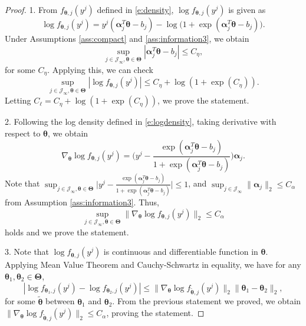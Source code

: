 \documentclass[10pt,a4paper]{amsart}
\newcommand{\bfTheta}{\boldsymbol{\Theta}}
\newcommand{\bfalpha}{\boldsymbol{\alpha}}
\newcommand{\bftheta}{\boldsymbol{\theta}}
\begin{document}
\begin{proof}
1. From $f_{\bftheta, j}(y^j)$ defined in \eqref{e:density}, $\log f_{\bftheta, j}(y^j)$ is given as
\begin{equation} \label{e:logdensity}
\log f_{\bftheta, j}(y^j) = y^j (\bfalpha_j^T \bftheta - b_j) - \log \Big( 1 + \exp( \bfalpha_j^T \bftheta - b_j )\Big).
\end{equation}
Under Assumptions \ref{ass:compact} and \ref{ass:information3}, we obtain 
\begin{equation*}
\sup_{j \in \mathcal{J}_{\infty}, \bftheta \in \bfTheta} |\bfalpha_j^T \bftheta - b_j| \le C_{\eta},
\end{equation*}
for some $C_{\eta}$. Applying this, we can check
\begin{equation*}
\sup_{j \in \mathcal{J}_{\infty}, \bftheta \in \bfTheta} | \log f_{\bftheta, j}(y^j) | \leq C_{\eta} + \log( 1 + \exp( C_\eta) ).
\end{equation*}
Letting $C_{\ell} = C_{\eta} + \log( 1 + \exp( C_\eta) )$, we prove the statement.

2. Following the log density defined in \eqref{e:logdensity}, taking derivative with respect to $\bftheta$, we obtain
\begin{equation} \label{e:logdenstiy_deriv}
\nabla_{\bftheta} \log f_{\bftheta,j}(y^j) = \Big( y^j - \frac{\exp(\bfalpha_j^T \bftheta - b_j)}{1 + \exp(\bfalpha_j^T \bftheta - b_j)} \Big) \bfalpha_j.
\end{equation}
Note that $\sup_{j \in \mathcal{J}_{\infty}, \bftheta \in \bfTheta} \Big| y^j - \frac{\exp(\bfalpha_j^T \bftheta - b_j)}{1 + \exp(\bfalpha_j^T \bftheta - b_j)} \Big| \le 1$, and $\sup_{j \in \mathcal{J}_{\infty}} \|\bfalpha_j \|_2 \leq C_{\alpha}$ from Assumption \ref{ass:information3}. Thus, 
\begin{equation*}
\sup_{j \in \mathcal{J}_{\infty}, \bftheta \in \bfTheta} \| \nabla_{\bftheta} \log f_{\bftheta, j}(y^j) \|_2 \le C_{\alpha}
\end{equation*}
holds and we prove the statement.

3. Note that $\log f_{\bftheta, j}(y^j)$ is continuous and differentiable function in $\bftheta$. Applying Mean Value Theorem and Cauchy-Schwartz in equality, we have for any $\bftheta_1, \bftheta_2 \in \bfTheta$,
\begin{equation*}
| \log f_{\bftheta_1, j}(y^j) - \log f_{\bftheta_2, j}(y^j) | \le \| \nabla_{\bftheta} \log f_{\tilde{\bftheta}, j}(y^j) \|_2 \| \bftheta_1 - \bftheta_2 \|_2,
\end{equation*}
for some $\tilde{\bftheta}$ between $\bftheta_1$ and $\bftheta_2$. From the previous statement we proved, we obtain $\| \nabla_{\bftheta} \log f_{\tilde{\bftheta}, j}(y^j) \|_2 \le C_{\alpha}$, proving the statement.


\end{proof}
\end{document}
